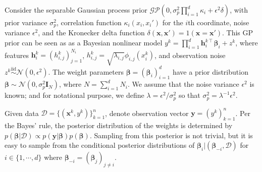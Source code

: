 \documentclass{article}
\begin{document}
Consider the separable Gaussian process prior
$\mathcal{GP}(0, \sigma_p^2 \prod_{i=1}^d \kappa_i + \epsilon^2 \delta)$,
with prior variance $\sigma_p^2$,
correlation function $\kappa_i(x_i, x_i')$ for the $i$th coordinate,
noise variance $\epsilon^2$,
and the Kronecker delta function $\delta(\mathbf{x}, \mathbf{x}') = 1(\mathbf{x} = \mathbf{x}')$.
This GP prior can be seen as as a Bayesian nonlinear model
$y^k = \prod_{i=1}^d \mathbf{h}_i^{k\intercal} \boldsymbol{\beta}_i + z^k$,
where features $\mathbf{h}_i^k = (h^k_{i,j})_{j=1}^{N_i}$,
$h^k_{i,j} = \sqrt{\lambda_{i,j}} \phi_{i,j}(x^k_i)$,
and observation noise $z^k \overset{\text{iid}}{\sim} \mathcal{N}(0, \epsilon^2)$.
The weight parameters $\boldsymbol{\beta} = (\boldsymbol{\beta}_i)_{i=1}^d$
have a prior distribution $\boldsymbol{\beta} \sim \mathcal{N}(0, \sigma_p^2\mathbf{I}_N)$,
where $N = \sum_{i=1}^d N_i$.
We assume that the noise variance $\epsilon^2$ is known;
and for notational purpose, we define $\lambda = \epsilon^2 / \sigma_p^2$
so that $\sigma_p^2 = \lambda^{-1} \epsilon^2$.

Given data $\mathcal{D} = \{(\mathbf{x}^k, y^k)\}_{k=1}^n$,
denote observation vector $\mathbf{y} = (y^k)_{k=1}^n$.
Per the Bayes' rule, the posterior distribution of the weights is determined by
$p(\boldsymbol{\beta} | \mathcal{D}) \propto
p(\mathbf{y} | \boldsymbol{\beta}) p(\boldsymbol{\beta})$.
Sampling from this posterior is not trivial,
but it is easy to sample from the conditional posterior distributions of
$\boldsymbol{\beta}_i | (\boldsymbol{\beta}_{-i}, \mathcal{D})$
for $i \in \{1, \cdots, d\}$ where $\boldsymbol{\beta}_{-i} = (\boldsymbol{\beta}_j)_{j \ne i}$.
\end{document}
